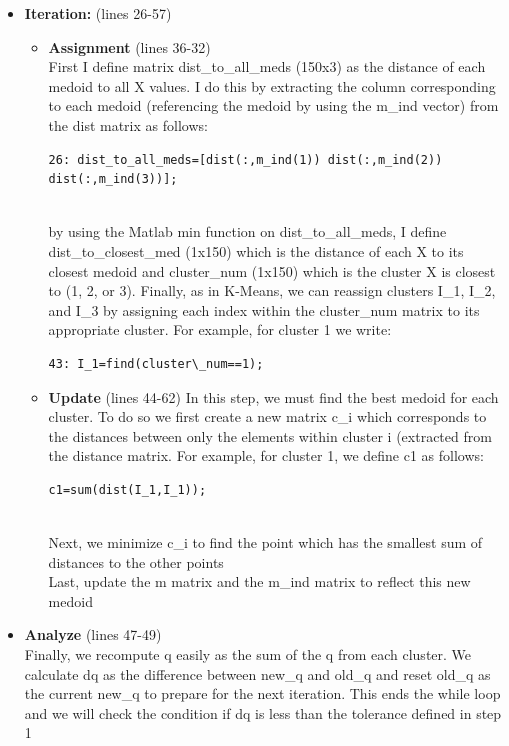 \documentclass{article}
\begin{document}
\begin{itemize}
    \item \textbf{Iteration:} (lines 26-57)\\
    \begin{itemize}
        \item \textbf{Assignment} (lines 36-32)\\
        First I define matrix dist\_to\_all\_meds (150x3) as the distance of each medoid to all X values.  I do this by extracting the column corresponding to each medoid (referencing the medoid by using the m\_ind vector) from the dist matrix as follows:\\
            \begin{verbatim}26: dist_to_all_meds=[dist(:,m_ind(1)) dist(:,m_ind(2)) dist(:,m_ind(3))];\end{verbatim}\\
        by using the Matlab min function on dist\_to\_all\_meds, I define dist\_to\_closest\_med (1x150) which is the distance of each X to its closest medoid and cluster\_num (1x150) which is the cluster X is closest to (1, 2, or 3).
        Finally, as in K-Means, we can reassign clusters I\_1, I\_2, and I\_3 by assigning each index within the cluster\_num matrix to its appropriate cluster.  For example, for cluster 1 we write:\\
        \begin{verbatim}43: I_1=find(cluster\_num==1);\end{verbatim}
        
      
        \item \textbf{Update} (lines 44-62)
        In this step, we must find the best medoid for each cluster.  To do so we first create a new matrix c\_i which corresponds to the distances between only the elements within cluster i (extracted from the distance matrix.  For example, for cluster 1, we define c1 as follows:\\
        \begin{verbatim}c1=sum(dist(I_1,I_1));\end{verbatim}\\
        Next, we minimize c\_i to find the point which has the smallest sum of distances to the other points\\
        Last, update the m matrix and the m\_ind matrix to reflect this new medoid
       
    \end{itemize}
    
    \item \textbf{Analyze} (lines 47-49)\\
    Finally, we recompute q easily as the sum of the q from each cluster.  We calculate dq as the difference between  new\_q and old\_q and reset old\_q as the current new\_q to prepare for the next iteration.  This ends the while loop and we will check the condition if dq is less than the tolerance defined in step 1
    
\end{itemize}
\end{document}
